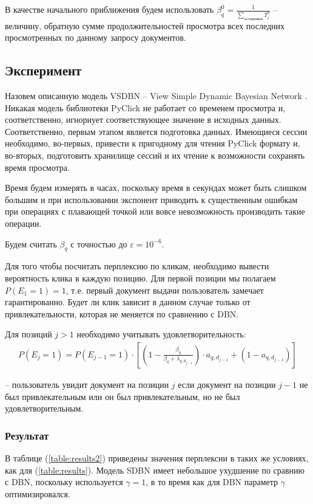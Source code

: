 \documentclass[diploma]{nanolab2015}
\begin{document}
В качестве начального приближения будем использовать $\beta_q^0 = \frac{1}{\sum\limits_{\text{остановки}} T_i^q}$ -- величину, обратную сумме продолжительностей просмотра всех последних просмотренных по данному запросу документов.

\subsection{Эксперимент}
Назовем описанную модель VSDBN -- View Simple Dynamic Bayesian Network \cite{vsdbn}.
Никакая модель библиотеки PyClick не работает со временем просмотра и, соответственно, игнориует соответствующее значение в исходных данных. Соответственно, первым этапом является подготовка данных. Имеющиеся сессии \cite{vkds} необходимо, во-первых, привести к пригодному для чтения PyClick формату и, во-вторых, подготовить хранилище сессий и их чтение к возможности сохранять время просмотра.

Время будем измерять в часах, поскольку время в секундах может быть слишком большим и при использовании экспонент приводить к существенным ошибкам при операциях с плавающей точкой или вовсе невозможность производить такие операции.

Будем считать $\beta_q$ с точностью до $\varepsilon = 10^{-6}$.

Для того чтобы посчитать перплексию по кликам, необходимо вывести вероятность клика в каждую позицию. Для первой позиции мы полагаем $P(E_1 = 1) = 1$, т.е. первый документ выдачи пользователь замечает гарантированно. Будет ли клик зависит в данном случае только от привлекательности, которая не меняется по сравнению с DBN.

Для позиций $j > 1$ необходимо учитывать удовлетворительность:
\begin{align}
    P(E_j = 1) = P(E_{j-1} = 1) \cdot \left[ \left(1 - \frac{\beta_q}{\beta_q + \lambda_{q,d_{j-1}}} \right) \cdot a_{q,d_{j-1}} + \left( 1 - a_{q,d_{j-1}} \right) \right] 
\end{align}

-- пользователь увидит документ на позиции $j$ если документ на позиции $j-1$ не был привлекательным или он был привлекательным, но не был удовлетворительным. 

\subsubsection{Результат}

В таблице (\ref{table:results2}) приведены значения перплексии в таких же условиях, как для (\ref{table:results}). Модель SDBN имеет небольшое ухудшение по сравнию с DBN, поскольку используется $\gamma = 1$, в то время как для DBN параметр $\gamma$ оптимизировался.
\end{document}

